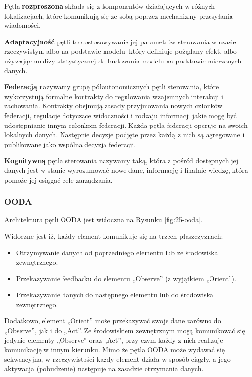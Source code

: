 Pętla \textbf{rozproszona} składa się z komponentów działających w różnych lokalizacjach, które komunikują się ze sobą poprzez mechanizmy przesyłania wiadomości. 

\textbf{Adaptacyjność} pętli to dostosowywanie jej parametrów sterowania w czasie rzeczywistym albo na podstawie modelu, który definiuje pożądany efekt, albo używając analizy statystycznej do budowania modelu na podstawie mierzonych danych.

\textbf{Federacją} nazywamy grupę półautonomicznych pętli sterowania, które wykorzystują formalne kontrakty do regulowania wzajemnych interakcji i zachowania. Kontrakty obejmują zasady przyjmowania nowych członków federacji, regulacje dotyczące widoczności i rodzaju informacji jakie mogę być udostępnianie innym członkom federacji. Każda pętla federacji operuje na swoich lokalnych danych. Następnie decyzje podjęte przez każdą z nich są agregowane i publikowane jako wspólna decyzja federacji.

\textbf{Kognitywną} pętla sterowania nazywamy taką, która z pośród dostępnych jej danych jest w stanie wyrozumować nowe dane, informację i finalnie wiedzę, która pomoże jej osiągać cele zarządzania.

\subsubsection{OODA}
Architektura pętli OODA \cite{boyd1995} jest widoczna na Rysunku \ref{fig:25-ooda}.

Widoczne jest iż, każdy element komunikuje się na trzech płaszczyznach:
\begin{itemize}
    \item Otrzymywanie danych od poprzedniego elementu lub ze środowiska zewnętrznego.
    \item Przekazywanie feedbacku do elementu „Observe” (z wyjątkiem „Orient”).
    \item Przekazywanie danych do następnego elementu lub do środowiska zewnętrznego.
\end{itemize}

Dodatkowo, element „Orient” może przekazywać swoje dane zarówno do „Observe”, jak i do „Act”. Ze środowiskiem zewnętrznym mogą komunikować się jedynie elementy „Observe” oraz „Act”, przy czym każdy z nich realizuje komunikację w innym kierunku. Mimo że pętla OODA może wydawać się sekwencyjna, w rzeczywistości każdy element działa w sposób ciągły, a jego aktywacja (pobudzenie) następuje na zasadzie otrzymania danych.


